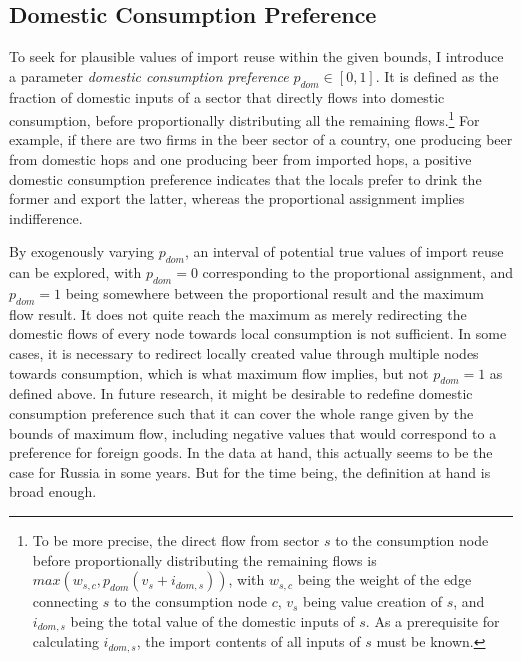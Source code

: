 \documentclass{paper}
\begin{document}
\subsection{Domestic Consumption Preference}
To seek for plausible values of import reuse within the given bounds, I introduce a parameter \emph{domestic consumption preference} $p_{dom} \in [0,1]$. It is defined as the fraction of domestic inputs of a sector that directly flows into domestic consumption, before proportionally distributing all the remaining flows.\footnote{To be more precise, the direct flow from sector $s$ to the consumption node before proportionally distributing the remaining flows is $max(w_{s,c}, p_{dom} (v_s + i_{dom,s}))$, with $w_{s,c}$ being the weight of the edge connecting $s$ to the consumption node $c$, $v_s$ being value creation of $s$, and $i_{dom,s}$ being the total value of the domestic inputs of $s$. As a prerequisite for calculating $i_{dom,s}$, the import contents of all inputs of $s$ must be known.} For example, if there are two firms in the beer sector of a country, one producing beer from domestic hops and one producing beer from imported hops, a positive domestic consumption preference indicates that the locals prefer to drink the former and export the latter, whereas the proportional assignment implies indifference.

By exogenously varying $p_{dom}$, an interval of potential true values of import reuse can be explored, with $p_{dom}=0$ corresponding to the proportional assignment, and $p_{dom}=1$ being somewhere between the proportional result and the maximum flow result. It does not quite reach the maximum as merely redirecting the domestic flows of every node towards local consumption is not sufficient. In some cases, it is necessary to redirect locally created value through multiple nodes towards consumption, which is what maximum flow implies, but not $p_{dom}=1$ as defined above. In future research, it might be desirable to redefine domestic consumption preference such that it can cover the whole range given by the bounds of maximum flow, including negative values that would correspond to a preference for foreign goods. In the data at hand, this actually seems to be the case for Russia in some years. But for the time being, the definition at hand is broad enough.
\end{document}
